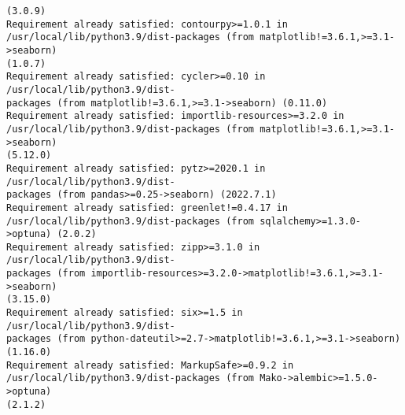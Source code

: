 \documentclass[11pt]{article}
\begin{document}
\begin{Verbatim}[commandchars=\\\{\}]
(3.0.9)
Requirement already satisfied: contourpy>=1.0.1 in
/usr/local/lib/python3.9/dist-packages (from matplotlib!=3.6.1,>=3.1->seaborn)
(1.0.7)
Requirement already satisfied: cycler>=0.10 in /usr/local/lib/python3.9/dist-
packages (from matplotlib!=3.6.1,>=3.1->seaborn) (0.11.0)
Requirement already satisfied: importlib-resources>=3.2.0 in
/usr/local/lib/python3.9/dist-packages (from matplotlib!=3.6.1,>=3.1->seaborn)
(5.12.0)
Requirement already satisfied: pytz>=2020.1 in /usr/local/lib/python3.9/dist-
packages (from pandas>=0.25->seaborn) (2022.7.1)
Requirement already satisfied: greenlet!=0.4.17 in
/usr/local/lib/python3.9/dist-packages (from sqlalchemy>=1.3.0->optuna) (2.0.2)
Requirement already satisfied: zipp>=3.1.0 in /usr/local/lib/python3.9/dist-
packages (from importlib-resources>=3.2.0->matplotlib!=3.6.1,>=3.1->seaborn)
(3.15.0)
Requirement already satisfied: six>=1.5 in /usr/local/lib/python3.9/dist-
packages (from python-dateutil>=2.7->matplotlib!=3.6.1,>=3.1->seaborn) (1.16.0)
Requirement already satisfied: MarkupSafe>=0.9.2 in
/usr/local/lib/python3.9/dist-packages (from Mako->alembic>=1.5.0->optuna)
(2.1.2)
    \end{Verbatim}
\end{document}
